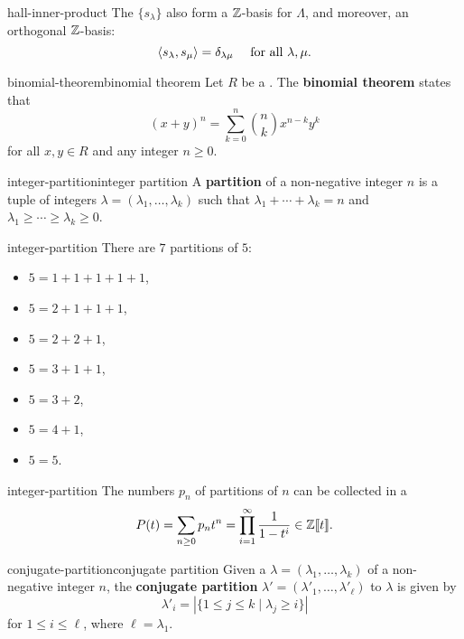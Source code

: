 \begin{example}{hall-inner-product}
    The  $\{ s_\lambda \}$ also form a $\mathbb{Z}$-basis for $\Lambda$, and moreover, an orthogonal $\mathbb{Z}$-basis:
    \[ \langle s_\lambda, s_\mu \rangle = \delta_{\lambda \mu} \quad \textup{ for all } \lambda, \mu . \]
\end{example}

\begin{topic}{binomial-theorem}{binomial theorem}
    Let $R$ be a . The \textbf{binomial theorem} states that
    \[ (x + y)^n = \sum_{k = 0}^{n} \binom{n}{k} x^{n - k} y^k \]
    for all $x, y \in R$ and any integer $n \ge 0$.
\end{topic}

\begin{topic}{integer-partition}{integer partition}
    A \textbf{partition} of a non-negative integer $n$ is a tuple of integers $\lambda = (\lambda_1, \ldots, \lambda_k)$ such that $\lambda_1 + \cdots + \lambda_k = n$ and $\lambda_1 \ge \cdots \ge \lambda_k \ge 0$.
\end{topic}

\begin{example}{integer-partition}
    There are $7$ partitions of $5$:
    \begin{itemize}
        \item $5 = 1 + 1 + 1 + 1 + 1$,
        \item $5 = 2 + 1 + 1 + 1$,
        \item $5 = 2 + 2 + 1$,
        \item $5 = 3 + 1 + 1$,
        \item $5 = 3 + 2$,
        \item $5 = 4 + 1$,
        \item $5 = 5$.
    \end{itemize}
\end{example}

\begin{example}{integer-partition}
    The numbers $p_n$ of partitions of $n$ can be collected in a 
    \[ P(t) = \sum_{n \ge 0} p_n t^n = \prod_{i = 1}^{\infty} \frac{1}{1 - t^i} \in \mathbb{Z} \llbracket t \rrbracket . \]
\end{example}

\begin{topic}{conjugate-partition}{conjugate partition}
    Given a  $\lambda = (\lambda_1, \ldots, \lambda_k)$ of a non-negative integer $n$, the \textbf{conjugate partition} $\lambda' = (\lambda'_1, \ldots, \lambda'_\ell)$ to $\lambda$ is given by
    \[ \lambda'_i = | \{ 1 \le j \le k \mid \lambda_j \ge i \} | \]
    for $1 \le i \le \ell$, where $\ell = \lambda_1$.
\end{topic}

